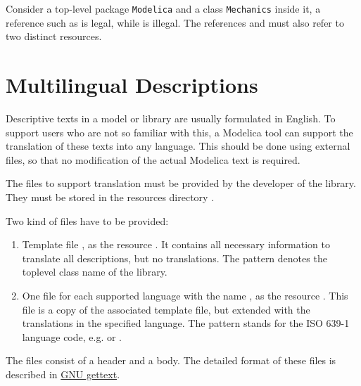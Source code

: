 \begin{example}
Consider a top-level package \lstinline!Modelica! and a class
\lstinline!Mechanics! inside it, a reference such as
 is legal, while
 is illegal.
The references  and  must also refer to two distinct resources.
\end{example}

\section{Multilingual Descriptions}\label{multilingual-descriptions}

\begin{nonnormative}
Descriptive texts in a model or library are usually formulated in English.
To support users who are not so familiar with this, a Modelica tool can support the translation of these texts into any language.
This should be done using external files, so that no modification of the actual Modelica text is required.
\end{nonnormative}

The files to support translation must be provided by the developer of the library.
They must be stored in the resources directory .

Two kind of files have to be provided:
\begin{enumerate}
\item Template file , as the resource .
It contains all necessary information to translate all descriptions, but no translations.
The pattern  denotes the toplevel class name of the library.
\item One file for each supported language with the name , as the resource .
This file is a copy of the associated template file, but extended with the translations in the specified language.
The pattern  stands for the ISO 639-1 language code, e.g.  or .
\end{enumerate}

The files consist of a header and a body.
The detailed format of these files is described in \href{https://www.gnu.org/software/gettext/manual/gettext.pdf}{GNU gettext}.

